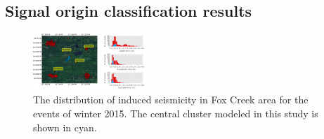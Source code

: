 \documentclass[letterpaper,11pt]{article}
\begin{document}
\subsection*{Signal origin classification results}
\begin{figure}
\centering
\includegraphics[width=0.38\textwidth]{./AntonBiryukov_bibtex/figure_map_a.png}
\vspace{-4mm}
\caption{The distribution of induced seismicity in Fox Creek area for the events of winter 2015. The central cluster modeled in this study is shown in cyan.}
\label{fig:map_clusters}
\end{figure}
\end{document}
